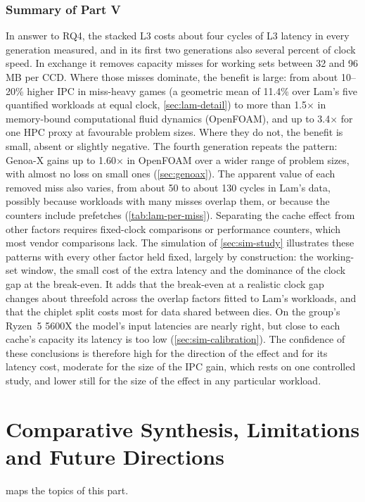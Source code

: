 \section{Summary of Part V}
In answer to RQ4, the stacked L3 costs about four cycles of L3 latency in every generation measured, and in its first two generations also several percent of clock speed. In exchange it removes capacity misses for working sets between 32 and 96\,MB per CCD. Where those misses dominate, the benefit is large: from about 10--20\% higher IPC in miss-heavy games (a geometric mean of 11.4\% over Lam's five quantified workloads at equal clock, \cref{sec:lam-detail}) to more than 1.5$\times$ in memory-bound computational fluid dynamics (OpenFOAM), and up to 3.4$\times$ for one HPC proxy at favourable problem sizes. Where they do not, the benefit is small, absent or slightly negative. The fourth generation repeats the pattern: Genoa-X gains up to 1.60$\times$ in OpenFOAM over a wider range of problem sizes, with almost no loss on small ones (\cref{sec:genoax}). The apparent value of each removed miss also varies, from about 50 to about 130 cycles in Lam's data, possibly because workloads with many misses overlap them, or because the counters include prefetches (\cref{tab:lam-per-miss}). Separating the cache effect from other factors requires fixed-clock comparisons or performance counters, which most vendor comparisons lack. The simulation of \cref{sec:sim-study} illustrates these patterns with every other factor held fixed, largely by construction: the working-set window, the small cost of the extra latency and the dominance of the clock gap at the break-even. It adds that the break-even at a realistic clock gap changes about threefold across the overlap factors fitted to Lam's workloads, and that the chiplet split costs most for data shared between dies. On the group's Ryzen~5 5600X the model's input latencies are nearly right, but close to each cache's capacity its latency is too low (\cref{sec:sim-calibration}). The confidence of these conclusions is therefore high for the direction of the effect and for its latency cost, moderate for the size of the IPC gain, which rests on one controlled study, and lower still for the size of the effect in any particular workload.
\clearpage
\part{Comparative Synthesis, Limitations and Future Directions}
\label{part:synthesis}
 maps the topics of this part.

